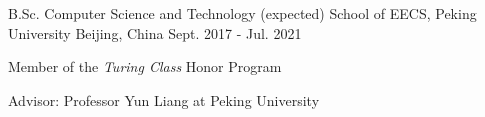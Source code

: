 

\begin{cventries}

  \cventry
    {B.Sc. Computer Science and Technology (expected)} %
    {School of EECS, Peking University} %
    {Beijing, China} %
    {Sept. 2017 - Jul. 2021} %
    {
      \begin{cvitems} %
      \item {Member of the \emph{Turing Class} Honor Program}
      \item {Advisor: Professor Yun Liang at Peking University}
      \end{cvitems}
    }

\end{cventries}
